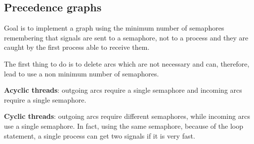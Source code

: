 \subsection{Precedence graphs}
Goal is to implement a graph using the minimum number of semaphores remembering that signals are sent to a semaphore, not to a process and they are caught by the first process able to receive them.

The first thing to do is to delete arcs which are not necessary and can, therefore, lead to use a non minimum number of semaphores.

\textbf{Acyclic threads}: outgoing arcs require a single semaphore and incoming arcs require a single semaphore.

\textbf{Cyclic threads}: outgoing arcs require different semaphores, while incoming arcs use a single  semaphore. In fact, using the same semaphore, because of the loop statement, a single process can get two signals if it is very fast.